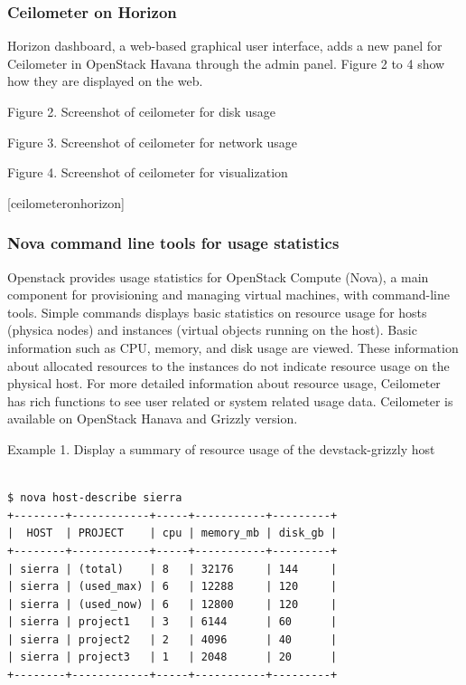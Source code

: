 \documentclass{sig-alternate}
\begin{document}
\subsubsection{Ceilometer on Horizon}

Horizon dashboard, a web-based graphical user interface, adds a new panel for Ceilometer in OpenStack Havana through the admin panel. Figure 2 to 4 show how they are displayed on the web.

Figure 2. Screenshot of ceilometer for disk usage

Figure 3. Screenshot of ceilometer for network usage

Figure 4. Screenshot of ceilometer for visualization

[ceilometeronhorizon]

\subsubsection{Nova command line tools for usage statistics}

Openstack provides usage statistics for OpenStack Compute (Nova), a main component for provisioning and managing virtual machines, with command-line tools. Simple commands displays basic statistics on resource usage for hosts (physica nodes) and instances (virtual objects running on the host). Basic information such as CPU, memory, and disk usage are viewed. These information about allocated resources to the instances do not indicate resource usage on the physical host. For more detailed information about resource usage, Ceilometer has rich functions to see user related or system related usage data. Ceilometer is available on OpenStack Hanava and Grizzly version.

\newline

Example 1. Display a summary of resource usage of the devstack-grizzly host

\begin{lstlisting}

$ nova host-describe sierra
+--------+------------+-----+-----------+---------+
|  HOST  | PROJECT    | cpu | memory_mb | disk_gb |
+--------+------------+-----+-----------+---------+
| sierra | (total)    | 8   | 32176     | 144     |
| sierra | (used_max) | 6   | 12288     | 120     |
| sierra | (used_now) | 6   | 12800     | 120     |
| sierra | project1   | 3   | 6144      | 60      |
| sierra | project2   | 2   | 4096      | 40      |
| sierra | project3   | 1   | 2048      | 20      |
+--------+------------+-----+-----------+---------+

\end{lstlisting}
\end{document}
